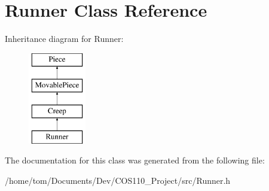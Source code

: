 \hypertarget{classRunner}{\section{Runner Class Reference}
\label{classRunner}
}
Inheritance diagram for Runner\-:\begin{figure}[H]
\begin{center}
\leavevmode
\includegraphics[height=4.000000cm]{classRunner}
\end{center}
\end{figure}


The documentation for this class was generated from the following file\-:\begin{DoxyCompactItemize}
\item 
/home/tom/\-Documents/\-Dev/\-C\-O\-S110\-\_\-\-Project/src/Runner.\-h\end{DoxyCompactItemize}
